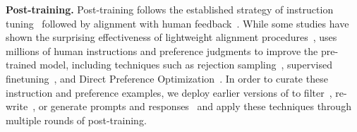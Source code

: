\textbf{Post-training.}
Post-training \llamathree follows the established strategy of instruction tuning~\citep{chung2022scalinginstruction,ouyang2022instructgpt} followed by alignment with human feedback~\citep{kaufmann2023survey}. While some studies have shown the surprising effectiveness of lightweight alignment procedures~\citep{zhou2024lima}, \llamathree uses millions of human instructions and preference judgments to improve the pre-trained model, including techniques such as rejection sampling~\citep{constitutional-ai-bai}, supervised finetuning~\citep{sanh2022multitask}, and Direct Preference Optimization~\citep{rafailov2023dpo}. In order to curate these instruction and preference examples, we deploy earlier versions of \llamathree to filter~\citep{liu2024makesgooddataalignment}, re-write~\citep{pan2024selfcorrection}, or generate prompts and responses~\citep{liu2024bestpractices} and apply these techniques through multiple rounds of post-training.

